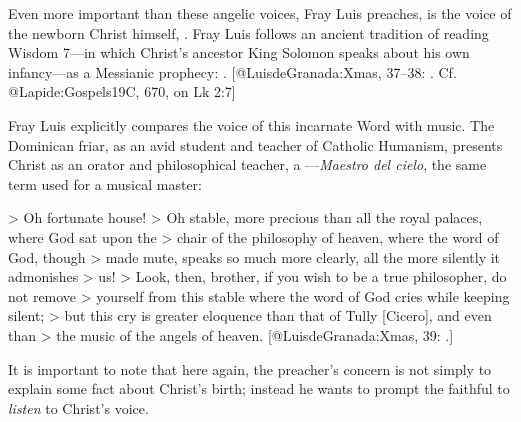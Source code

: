 \noindent
Even more important than these angelic voices, Fray Luis preaches, is the voice
of the newborn Christ himself, .
Fray Luis follows an ancient tradition of reading Wisdom 7---in which Christ's
ancestor King Solomon speaks about his own infancy---as a Messianic prophecy:
.
[@LuisdeGranada:Xmas, 37--38:
.
Cf. @Lapide:Gospels19C, 670, on Lk 2:7]

Fray Luis explicitly compares the voice of this incarnate Word with music.
The Dominican friar, as an avid student and teacher of Catholic Humanism,
presents Christ as an orator and philosophical teacher, a ---\emph{Maestro del cielo}, the same term used for a musical master:

> Oh fortunate house!
> Oh stable, more precious than all the royal palaces, where God sat upon the
> chair  of the philosophy of heaven, where the word of God, though
> made mute, speaks so much more clearly, all the more silently it admonishes
> us!
> Look, then, brother, if you wish to be a true philosopher, do not remove
> yourself from this stable where the word of God cries while keeping silent;
> but this cry is greater eloquence than that of Tully [Cicero], and even than
> the music of the angels of heaven.
[@LuisdeGranada:Xmas, 39: 
.]

\noindent
It is important to note that here again, the preacher's concern is not simply to
explain some fact about Christ's birth; instead he wants to prompt the faithful
to \emph{listen} to Christ's voice.

